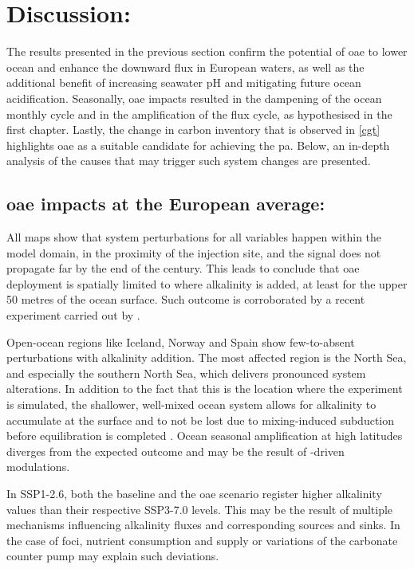 \chapter{Discussion:}

The results presented in the previous section confirm the potential of \ac{oae} to lower ocean  and enhance the downward  flux in European waters, as well as the additional benefit of increasing seawater pH and mitigating future ocean acidification. Seasonally, \ac{oae} impacts resulted in the dampening of the ocean  monthly cycle and in the amplification of the  flux cycle, as hypothesised in the first chapter. Lastly, the change in carbon inventory that is observed in \cref{cgt} highlights \ac{oae} as a suitable candidate for achieving the \ac{pa}. Below, an in-depth analysis of the causes that may trigger such system changes are presented. 

\section[\texorpdfstring{OAE}{OAE} impacts at the European average:]{\ac{oae} impacts at the European average:}

All maps show that system perturbations for all variables happen within the model domain, in the proximity of the injection site, and the signal does not propagate far by the end of the century. This leads to conclude that \ac{oae} deployment is spatially limited to where alkalinity is added, at least for the upper 50 metres of the ocean surface. Such outcome is corroborated by a recent experiment carried out by \cite{wang2023simulated}. 

Open-ocean regions like Iceland, Norway and Spain show few-to-absent perturbations with alkalinity addition. The most affected region is the North Sea, and especially the southern North Sea, which delivers pronounced system alterations. In addition to the fact that this is the location where the experiment is simulated, the shallower, well-mixed ocean system allows for alkalinity to accumulate at the surface and to not be lost due to mixing-induced subduction before equilibration is completed \citep{wang2023simulated}. Ocean  seasonal amplification at high latitudes diverges from the expected outcome and may be the result of -driven modulations. 

In SSP1-2.6, both the baseline and the \ac{oae} scenario register higher alkalinity values than their respective SSP3-7.0 levels. This may be the result of multiple mechanisms influencing alkalinity fluxes and corresponding sources and sinks. In the case of \ac{foci}, nutrient consumption and supply or variations of the carbonate counter pump may explain such deviations. 

